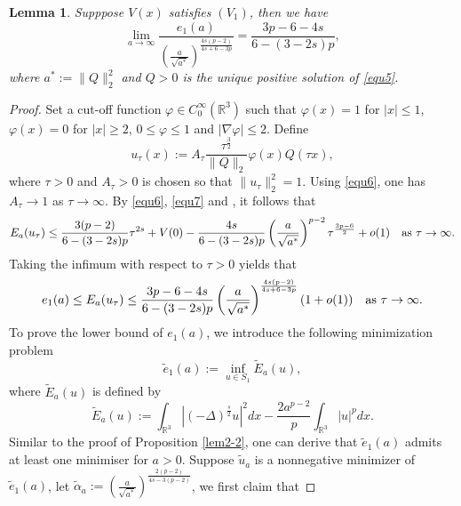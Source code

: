 \documentclass[reqno, 11pt]{amsart} %
\numberwithin{equation}{section}
\newtheorem{lemma}[theorem]{Lemma}
\begin{document}
	\begin{lemma}\label{lem3-1}
		Supppose $V(x)$ satisfies $(V_{1})$, then we have
		\begin{equation}\label{equ3-1}
			\lim_{a\rightarrow\infty}\frac{e_{1}(a)}{\left(\frac{a}{\sqrt{a^{\ast}}}\right)^{\frac{4s(p-2)}{4s+6-3p}}}=\frac{3p-6-4s}{6-(3-2s)p},
		\end{equation}
		where $a^{\ast}:=\|Q\|_{2}^{2}$ and $Q>0$ is the unique positive solution of \eqref{equ5}.
	\end{lemma}
	\begin{proof}
		Set a cut-off function $\varphi\in C_{0}^{\infty}(\mathbb{R}^{3})$ such that $\varphi(x)=1$ for $|x|\leq1$, $\varphi(x)=0$ for $|x|\geq2$, $0\leq\varphi\leq1$ and $|\nabla\varphi|\leq2$. Define
		\begin{equation*}
			u_{\tau}(x):=A_{\tau}\frac{\tau^{\frac{3}{2}}}{\|Q\|_{2}}\varphi(x)Q(\tau x),
		\end{equation*}
		where $\tau>0$ and $A_{\tau}>0$ is chosen so that $\|u_{\tau}\|_{2}^{2}=1$. Using \eqref{equ6}, one has $A_{\tau}\rightarrow1$ as $\tau\rightarrow\infty$. By \eqref{equ6}, \eqref{equ7} and \cite[Lemma 3.2]{D}, it follows that
		\begin{equation*}
			E_{a}(u_{\tau})\leq\frac{3(p-2)}{6-(3-2s)p}\tau^{2s}+V(0)-\frac{4s}{6-(3-2s)p}\left(\frac{a}{\sqrt{a^{\ast}}}\right)^{p-2}\tau^{\frac{3p-6}{2}}+o(1) \quad \hbox{as $\tau\rightarrow\infty$}.
		\end{equation*}
		Taking the infimum with respect to $\tau>0$ yields that
		\begin{equation}\label{equ3-2}
			e_{1}(a)\leq	E_{a}(u_{\tau})\leq\frac{3p-6-4s}{6-(3-2s)p}\left(\frac{a}{\sqrt{a^{\ast}}}\right)^{\frac{4s(p-2)}{4s+6-3p}}(1+o(1))\quad \hbox{as $\tau\rightarrow\infty$}.
		\end{equation}
		To prove the lower bound of $e_{1}(a)$, we introduce the following minimization problem
		\begin{equation}\label{equ3-2-1}
			\tilde{e}_{1}(a):=\inf_{u\in S_{1}}\tilde{E}_{a}(u),
		\end{equation}
		where $\tilde{E}_{a}(u)$ is defined by
		\begin{equation*}
			\tilde{E}_{a}(u):=\int_{\mathbb{R}^{3}}|(-\Delta)^{\frac{s}{2}}u|^{2}dx-\frac{2a^{p-2}}{p}\int_{\mathbb{R}^{3}}|u|^{p}dx.
		\end{equation*}
		Similar to the proof of Proposition \ref{lem2-2}, one can derive that $\tilde{e}_{1}(a)$ admits at least one minimiser for $a>0$. Suppose $\tilde{u}_{a}$ is a nonnegative minimizer of $\tilde{e}_{1}(a)$, let $\tilde{\alpha}_{a}:=\left(\frac{a}{\sqrt{a^{\ast}}}\right)^{\frac{2(p-2)}{4s-3(p-2)}}$, we first claim that

\end{proof}
\end{document}
